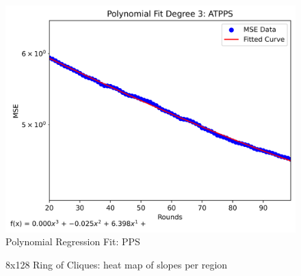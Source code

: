 \begin{figure}[H]
    \centering
    \includegraphics[width=\linewidth]{figures/Simulation_outcomes/RingOfCliques/8x128/ATPPS/ATPPS_modelfitting_rounds_99_model_2.png}
    \caption{Polynomial Regression Fit: PPS}
    \label{fig:8x128atppsRingOfCliquesModelFit}
\end{figure}

\begin{figure}
    \centering
    \caption{8x128 Ring of Cliques: heat map of slopes per region}
    \label{fig:128x8ringOfCliquesslopes}
\end{figure}

